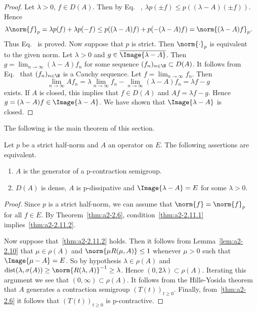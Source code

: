 \begin{proof}
Let $\lambda > 0$, $f \in D(A)$.
Then by Eq.~  
, $\lambda p(\pm f) \leq p((\lambda - A)(\pm f))$.
Hence 
\[
\lambda\norm{f}_{p} = \lambda p(f) + \lambda p(-f) \leq p((\lambda - A)f) + p(-(\lambda-A)f) = \norm{(\lambda-A)f}_{p}.
\]
Thus Eq.~   
is proved.
Now suppose that $p$ is strict.
Then $\norm{\cdot}_{p}$ is equivalent to the given norm.
Let $\lambda > 0$ and $g \in \overline{\Image{\lambda - A}}$.
Then $g = \lim_{n\to\infty} (\lambda - A)f_{n}$ for some sequence $(f_{n})_{n \in \N} \subset D(A)$.
It follows from Eq.~  
that $(f_{n})_{n\in\N}$ is a Cauchy sequence.
Let $f = \lim_{n\to\infty} f_{n}$.
Then 
\[
\lim_{n\to\infty} Af_{n} 
= \lambda\lim_{n\to\infty} f_{n} - \lim_{n\to\infty} (\lambda - A)f_{n} = \lambda f - g
\]
exists.
If\/ $A$ is closed, this implies that $f \in D(A)$ and $Af = \lambda f - g$.
Hence $g = (\lambda - A)f \in \Image{\lambda - A}$.
We have shown that $\Image{\lambda - A}$ is closed.
\end{proof}

The following is the main theorem of this section.

\begin{theorem}\label{thm:a2-2.11}
Let $p$ be a strict half-norm and $A$ an operator on $E$.
The following assertions are equivalent.
\begin{enumerate}[\upshape (a)]
\item \label{thm:a2-2.11.1}
$A$ is the generator of a p-contraction semigroup.
\item \label{thm:a2-2.11.2}
$D(A)$ is dense, $A$ is p-dissipative and $\Image{\lambda - A} = E$ for some $\lambda > 0$.
\end{enumerate}
\end{theorem}
\begin{proof}
Since $p$ is a strict half-norm, we can assume that $\norm{f} = \norm{f}_{p}$ for all $f \in E$.
By Theorem~\ref{thm:a2-2.6}, condition~\ref{thm:a2-2.11.1} implies~\ref{thm:a2-2.11.2}. 

Now suppose that~\ref{thm:a2-2.11.2}   holds.
Then it follows from Lemma~\ref{lem:a2-2.10}   
that $\mu \in \rho(A)$ and $\norm{\mu R(\mu,A)} \leq 1$ whenever $\mu > 0$ such that $\Image{\mu-A} = E$.
So by hypothesis $\lambda \in \rho(A)$ and 
$\text{dist}(\lambda,\sigma(A)) \geq \norm{R(\lambda,A)}^{-1} \geq \lambda$.
Hence $(0,2\lambda) \subset \rho(A)$.
Iterating this argument we see that $(0,\infty) \subset \rho(A)$.
It follows from the Hille-Yosida theorem that $A$ generates a contraction semigroup $(T(t))_{t\geq 0}$.
Finally, from~\ref{thm:a2-2.6} 
it follows that $(T(t))_{t\geq 0}$ is p-contractive.
\end{proof}

